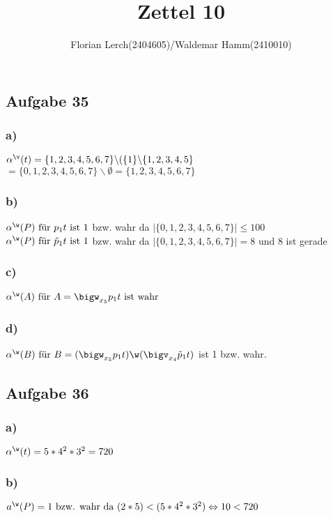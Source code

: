 \documentclass[11pt]{amsart}
\title{Zettel 10}
\author{Florian Lerch(2404605)/Waldemar Hamm(2410010)}
\begin{document}
\maketitle

\subsection*{Aufgabe 35}

\subsubsection*{a)}
\( \alpha^{\v}(t) = \{1,2,3,4,5,6,7\} \backslash ( \{1\} \backslash \{1,2,3,4,5\} \) \\
\( = \{0,1,2,3,4,5,6,7\} \backslash \emptyset = \{1,2,3,4,5,6,7\} \)

\subsubsection*{b)}
\( \alpha^{\w}(P) \mbox{ für } p_1t \mbox{ ist } 1\) bzw. wahr da \( | \{0,1,2,3,4,5,6,7\} | \leq 100 \) \\
\( \alpha^{\w}(P) \mbox{ für } \tilde{p}_1t \mbox{ ist } 1\) bzw. wahr da \( | \{0,1,2,3,4,5,6,7\} | = 8\) und 8 ist gerade \\

\subsubsection*{c)}
\( \alpha^{\w}(A) \mbox{ für } A = \bigw_{x_5}p_1t \mbox{ ist wahr} \)

\subsubsection*{d)}
\( \alpha^{\w}(B) \mbox{ für } B = (\bigw_{x_5}p_1t)\w(\bigv_{x_4}\tilde{p}_1t) \) ist 1 bzw. wahr.

\subsection*{Aufgabe 36}

\subsubsection*{a)}
\( \alpha^{\w}(t) =  5*4^2*3^2 = 720 \)

\subsubsection*{b)}
\( a^{\w}(P) = 1 \mbox{ bzw. wahr da } (2 * 5) < (5 * 4^2 * 3^2) \Leftrightarrow 10 < 720 \)
\end{document}
